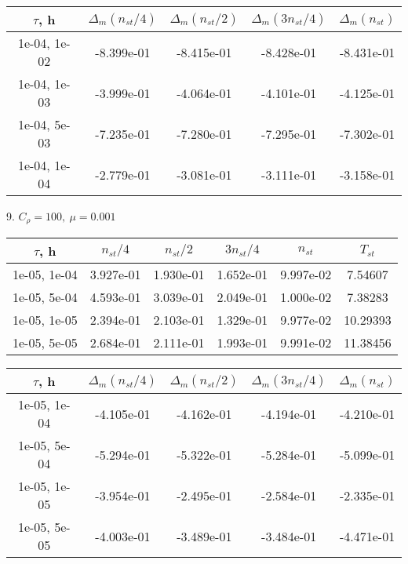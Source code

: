 \begin{center}
	\begin{tabular}{ |c|c|c|c|c| } 
		\hline
		$\tau$, h & $\Delta_m (n_{st}/ 4)$ & $\Delta_m (n_{st}/ 2)$ & $\Delta_m (3n_{st}/ 4)$ & $\Delta_m (n_{st})$ \\ 
		\hline
		1e-04, 1e-02 & -8.399e-01 & -8.415e-01 & -8.428e-01 & -8.431e-01 \\ 
		\hline
		1e-04, 1e-03 & -3.999e-01 & -4.064e-01 & -4.101e-01 & -4.125e-01 \\ 
		\hline
		1e-04, 5e-03 & -7.235e-01 & -7.280e-01 & -7.295e-01 & -7.302e-01 \\ 
		\hline
		1e-04, 1e-04 & -2.779e-01 & -3.081e-01 & -3.111e-01 & -3.158e-01 \\ 
		\hline
	\end{tabular}
\end{center}

9. $C_{\rho} = 100, \ \mu = 0.001$
\begin{center}
	\begin{tabular}{ |c|c|c|c|c|c| } 
		\hline
		$\tau$, h & $n_{st}/ 4$ & $n_{st}/ 2$ & $3n_{st}/ 4$ & $n_{st}$ & $T_{st}$ \\ 
		\hline
		1e-05, 1e-04 & 3.927e-01 & 1.930e-01 & 1.652e-01 & 9.997e-02 & 7.54607\\ 
		\hline
		1e-05, 5e-04 & 4.593e-01 & 3.039e-01 & 2.049e-01 & 1.000e-02 & 7.38283\\ 
		\hline
		1e-05, 1e-05 & 2.394e-01 & 2.103e-01 & 1.329e-01 & 9.977e-02 & 10.29393\\ 
		\hline
		1e-05, 5e-05 & 2.684e-01 & 2.111e-01 & 1.993e-01 & 9.991e-02 & 11.38456\\ 
		\hline
	\end{tabular}
\end{center}

\begin{center}
	\begin{tabular}{ |c|c|c|c|c| } 
		\hline
		$\tau$, h & $\Delta_m (n_{st}/ 4)$ & $\Delta_m (n_{st}/ 2)$ & $\Delta_m (3n_{st}/ 4)$ & $\Delta_m (n_{st})$ \\ 
		\hline
		1e-05, 1e-04 & -4.105e-01 & -4.162e-01 & -4.194e-01 & -4.210e-01 \\ 
		\hline
		1e-05, 5e-04 & -5.294e-01 & -5.322e-01 & -5.284e-01 & -5.099e-01 \\ 
		\hline
		1e-05, 1e-05 & -3.954e-01 & -2.495e-01 &-2.584e-01  & -2.335e-01 \\ 
		\hline
		1e-05, 5e-05 & -4.003e-01 & -3.489e-01 & -3.484e-01 & -4.471e-01 \\ 
		\hline
	\end{tabular}
\end{center}

